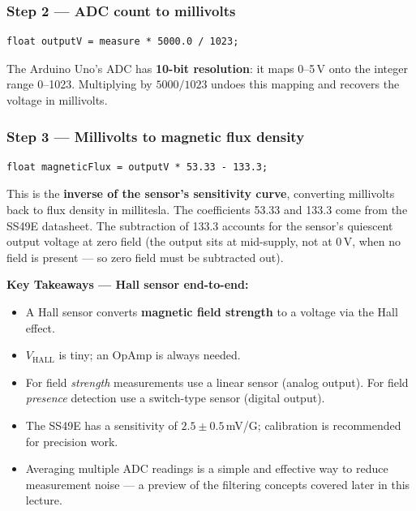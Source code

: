 \documentclass[12pt, a4paper]{article}
\begin{document}
\subsubsection*{Step 2 — ADC count to millivolts}
\begin{verbatim}
float outputV = measure * 5000.0 / 1023;
\end{verbatim}

The Arduino Uno's ADC has \textbf{10-bit resolution}: it maps
0–5\,V onto the integer range 0–1023.  Multiplying by $5000/1023$
undoes this mapping and recovers the voltage in millivolts.

\subsubsection*{Step 3 — Millivolts to magnetic flux density}
\begin{verbatim}
float magneticFlux = outputV * 53.33 - 133.3;
\end{verbatim}

This is the \textbf{inverse of the sensor's sensitivity curve},
converting millivolts back to flux density in millitesla.  The
coefficients 53.33 and 133.3 come from the SS49E datasheet.
The subtraction of 133.3 accounts for the sensor's quiescent output
voltage at zero field (the output sits at mid-supply, not at 0\,V, when
no field is present — so zero field must be subtracted out).

\begin{keybox}
  \textbf{Key Takeaways — Hall sensor end-to-end:}
  \begin{itemize}[leftmargin=1.5em, topsep=2pt]
    \item A Hall sensor converts \textbf{magnetic field strength} to a
          voltage via the Hall effect.
    \item $V_\mathrm{HALL}$ is tiny; an OpAmp is always needed.
    \item For field \emph{strength} measurements use a linear sensor
          (analog output). For field \emph{presence} detection use a
          switch-type sensor (digital output).
    \item The SS49E has a sensitivity of $2.5 \pm 0.5$\,mV/G;
          calibration is recommended for precision work.
    \item Averaging multiple ADC readings is a simple and effective
          way to reduce measurement noise — a preview of the filtering
          concepts covered later in this lecture.
  \end{itemize}
\end{keybox}
\end{document}
